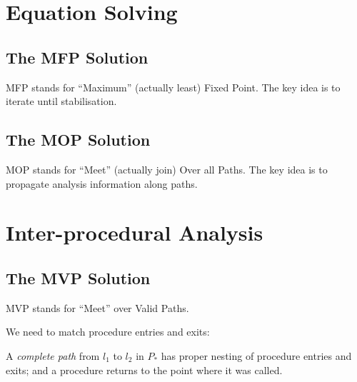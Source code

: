 \section{Equation Solving}

\subsection{The MFP Solution}

MFP stands for ``Maximum'' (actually least) Fixed Point.  The key idea
is to iterate until stabilisation.





\subsection{The MOP Solution}

MOP stands for ``Meet'' (actually join) Over all Paths.  The key idea
is to propagate analysis information along paths.



\section{Inter-procedural Analysis}


\subsection{The MVP Solution}

MVP stands for ``Meet'' over Valid Paths.

We need to match procedure entries and exits:

A \textit{complete path} from $l_1$ to $l_2$ in $P_*$ has proper
nesting of procedure entries and exits; and a procedure returns to the
point where it was called.



